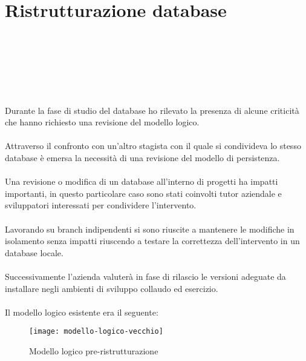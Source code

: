 
\chapter{Ristrutturazione database}
\label{cap:ristrutturazione-database}

\\\\\\\\\\\\
Durante la fase di studio del database ho rilevato la presenza di
alcune criticità che hanno richiesto una revisione del modello logico.
\\\\
Attraverso il confronto con un'altro stagista con il quale si condivideva lo stesso database 
è emersa la necessità di una revisione del modello di persistenza.
\\\\
Una revisione o modifica di un database all'interno di progetti ha impatti importanti, in questo
particolare caso sono stati coinvolti tutor aziendale e sviluppatori interessati per condividere
l'intervento. 
\\\\
Lavorando su branch indipendenti si sono riuscite a mantenere le modifiche 
in isolamento senza impatti riuscendo a testare la correttezza dell'intervento in un database locale.
\\\\
Successivamente l'azienda valuterà in fase di rilascio le versioni adeguate da installare
negli ambienti di sviluppo collaudo ed esercizio.
\\\\
\clearpage
Il modello logico esistente era il seguente:
\begin{figure}[H]
  \centering
  \texttt{[image: modello-logico-vecchio]}
  \caption{Modello logico pre-ristrutturazione}
\end{figure}

